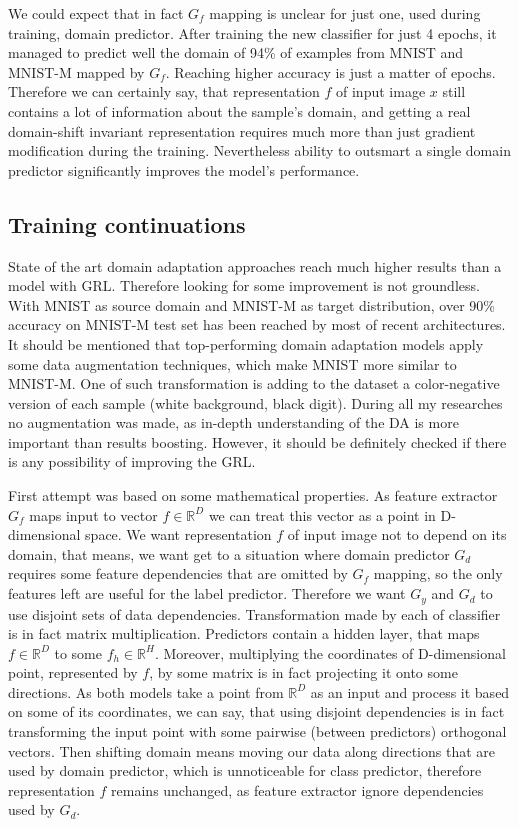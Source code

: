 \documentclass{article}
\begin{document}
\par
We could expect that in fact $G_{f}$ mapping is unclear for just one, used during training, domain predictor. After training the new classifier for just 4 epochs, it managed to predict well the domain of 94\% of examples from MNIST and MNIST-M mapped by $G_{f}$. Reaching higher accuracy is just a matter of epochs. Therefore we can certainly say, that representation $f$ of input image $x$ still contains a lot of information about the sample's domain, and getting a real domain-shift invariant representation requires much more than just gradient modification during the training. Nevertheless ability to outsmart a single domain predictor significantly improves the model's performance.

\subsection{Training continuations}
State of the art domain adaptation approaches reach much higher results than a model with GRL. Therefore looking for some improvement is not groundless. With MNIST as source domain and MNIST-M as target distribution, over 90\% accuracy on MNIST-M test set has been reached by most of recent architectures. It should be mentioned that top-performing domain adaptation models apply some data augmentation techniques, which make MNIST more similar to MNIST-M. One of such transformation is adding to the dataset a color-negative version of each sample (white background, black digit). During all my researches no augmentation was made, as in-depth understanding of the DA is more important than results boosting. However, it should be definitely checked if there is any possibility of improving the GRL.
\par
First attempt was based on some mathematical properties. As feature extractor $G_{f}$ maps input to vector $f \in \mathbb{R}^{D}$ we can treat this vector as a point in D-dimensional space. We want representation $f$ of input image not to depend on its domain, that means, we want get to a situation where domain predictor $G_{d}$ requires some feature dependencies that are omitted by $G_{f}$ mapping, so the only features left are useful for the label predictor. Therefore we want $G_{y}$ and $G_{d}$ to use disjoint sets of data dependencies. Transformation made by each of classifier is in fact matrix multiplication. Predictors contain a hidden layer, that maps $f \in \mathbb{R}^{D}$ to some $f_{h} \in \mathbb{R}^{H}$. Moreover, multiplying the coordinates of D-dimensional point, represented by $f$, by some matrix is in fact projecting it onto some directions.  As both models take a point from $\mathbb{R}^{D}$ as an input and process it based on some of its coordinates, we can say, that using disjoint dependencies is in fact transforming the input point with some pairwise (between predictors) orthogonal vectors. Then shifting domain means moving our data along directions that are used by domain predictor, which is unnoticeable for class predictor, therefore representation $f$ remains unchanged, as feature extractor ignore dependencies used by $G_{d}$.
\end{document}
